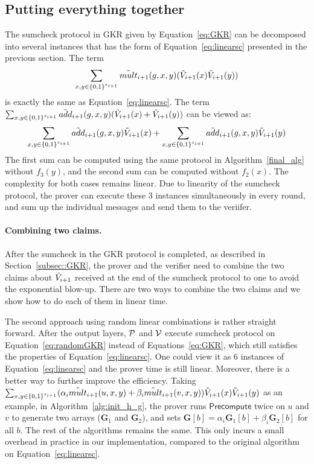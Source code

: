 {{\subsection{Putting everything together}

The sumcheck protocol in GKR given by Equation~\ref{eq:GKR} can be decomposed into several instances that has the form of Equation~\ref{eq:linearsc} presented in the previous section. The term $$\sum_{x,y\in\binary^{s_{i+1}}}\tmult_{i+1}(g,x,y)(\tV_{i+1}(x)\tV_{i+1}(y))$$ is exactly the same as Equation~\ref{eq:linearsc}.  The term $\sum_{x,y\in\binary^{s_{i+1}}}\tadd_{i+1}(g,x,y)(\tV_{i+1}(x)+\tV_{i+1}(y))$ can be viewed as: 
\[
\sum_{x,y\in\binary^{s_{i+1}}}\tadd_{i+1}(g,x,y)\tV_{i+1}(x)+\sum_{x,y\in\binary^{s_{i+1}}}\tadd_{i+1}(g,x,y)\tV_{i+1}(y)
\]
The first sum can be computed using the same protocol in Algorithm~\ref{final_alg} without $f_3(y)$, and the second sum can be computed without $f_2(x)$. The complexity for both cases remains linear. Due to linearity of the sumcheck protocol, the prover can execute these 3 instances simultaneously in every round, and sum up the individual messages and send them to the veriifer.



\paragraph{Combining two claims.} After the sumcheck in the GKR protocol is completed, as described in Section~\ref{subsec::GKR}, the prover and the verifier need to combine the two claims about $\tV_{i+1}$ received at the end of the sumcheck protocol to one to avoid the exponential blow-up. There are two ways to combine the two claims and we show how to do each of them in linear time. 

The second approach using random linear combinations is rather straight forward. After the output layers, $\P$ and $\V$ execute sumcheck protocol on Equation~\ref{eq:randomGKR} instead of Equations~\ref{eq:GKR}, which still satisfies the properties of Equation~\ref{eq:linearsc}. One could view it as 6 instances of Equation~\ref{eq:linearsc} and the prover time is still linear. Moreover, there is a better way to further improve the efficiency. Taking $\sum_{x, y \in\binary^{s_{i+1}}}(\alpha_i\tmult_{i+1}(u,x,y)+\beta_i\tmult_{i+1}(v,x,y))\tV_{i+1}(x)\tV_{i+1}(y)$ as an example, in Algorithm~\ref{alg:init_h_g}, the prover runs $\mathsf{Precompute}$ twice on $u$ and $v$ to generate two arrays ($\textbf{G}_1$ and $\textbf{G}_2$), and sets $\textbf{G}[b]=\alpha_i \textbf{G}_1[b] + \beta_i\textbf{G}_2[b]$ for all $b$. The rest of the algorithms remains the same. This only incurs a small overhead in practice in our implementation, compared to the original algorithm on Equation~\ref{eq:linearsc}.

}}
